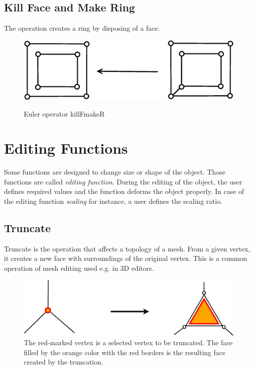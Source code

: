 \subsection{Kill Face and Make Ring}

The operation creates a ring by disposing of a face.

\begin{figure}[H]
\centering
\includegraphics[scale=0.25]{../img/killFmakeR.eps}
\label{fig:killfmaker}
\caption{Euler operator killFmakeR}
\end{figure}


\section{Editing Functions}
\label{sec:edit_f}
Some functions are designed to change size or shape of the object. Those functions are called 
\emph{editing function}.
During the editing of the object, the user defines required values and the function deforms the
object properly. In case of the editing function \emph{scaling} for instance, a user defines the scaling
ratio.

\subsection{Truncate}

Truncate is the operation that affects a topology of a mesh. From a given vertex, it creates a new face with
surroundings of the original vertex. This is a common operation of mesh editing used e.g. in
3D editors.\\

\begin{figure}[ht]
\centering
\includegraphics[scale=0.2]{../img/truncate.eps}
\caption{The red-marked vertex is a selected vertex to be truncated.
The face filled by the orange color with the red borders is the resulting face created by the truncation.}
\end{figure}

